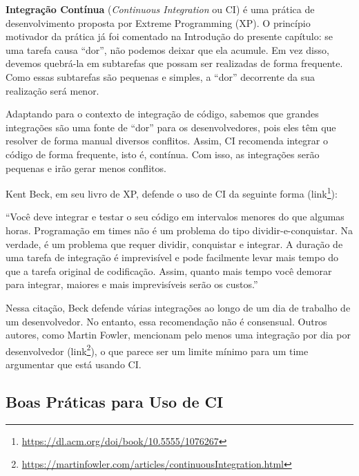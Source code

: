 \documentclass[
  11pt,
  twoside]{book}
\DeclareRobustCommand{\href}[2]{#2\footnote{\url{#1}}}
\renewenvironment{quote}{\centering \vspace{1.5ex} \begin{tcolorbox}[colback=backcolor, width=4.9in]}{\end{tcolorbox}}
\begin{document}

\textbf{Integração Contínua} (\emph{Continuous Integration} ou CI) é uma
prática de desenvolvimento proposta por Extreme Programming (XP). O
princípio motivador da prática já foi comentado na Introdução do
presente capítulo: se uma tarefa causa ``dor'', não podemos deixar que
ela acumule. Em vez disso, devemos quebrá-la em subtarefas que possam
ser realizadas de forma frequente. Como essas subtarefas são pequenas e
simples, a ``dor'' decorrente da sua realização será menor.

Adaptando para o contexto de integração de código, sabemos que grandes
integrações são uma fonte de ``dor'' para os desenvolvedores, pois eles
têm que resolver de forma manual diversos conflitos. Assim, CI recomenda
integrar o código de forma frequente, isto é, contínua. Com isso, as
integrações serão pequenas e irão gerar menos conflitos.

 Kent Beck, em seu livro de XP, defende o uso de CI da
seguinte forma
(\href{https://dl.acm.org/doi/book/10.5555/1076267}{link}):

\begin{quote}
``Você deve integrar e testar o seu código em intervalos menores do que
algumas horas. Programação em times não é um problema do tipo
dividir-e-conquistar. Na verdade, é um problema que requer dividir,
conquistar e integrar. A duração de uma tarefa de integração é
imprevisível e pode facilmente levar mais tempo do que a tarefa original
de codificação. Assim, quanto mais tempo você demorar para integrar,
maiores e mais imprevisíveis serão os custos.''
\end{quote}

 Nessa citação, Beck defende várias integrações ao
longo de um dia de trabalho de um desenvolvedor. No entanto, essa
recomendação não é consensual. Outros autores, como Martin Fowler,
mencionam pelo menos uma integração por dia por desenvolvedor
(\href{https://martinfowler.com/articles/continuousIntegration.html}{link}),
o que parece ser um limite mínimo para um time argumentar que está
usando CI.

\hypertarget{boas-pruxe1ticas-para-uso-de-ci}{%
\subsection{Boas Práticas para Uso de
CI}\label{boas-pruxe1ticas-para-uso-de-ci}}

\end{document}
